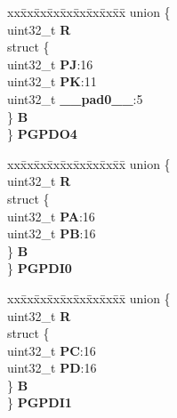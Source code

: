 \begin{DoxyCompactItemize}
\begin{tabbing}
\end{tabbing}\item 
\mbox{\label{structSIU__tag_acfe4dfd750203f12bea97e39471a4794}} 
\begin{tabbing}
xx\=xx\=xx\=xx\=xx\=xx\=xx\=xx\=xx\=\kill
union \{\\
\>uint32\_t {\bfseries R}\\
\>struct \{\\
\>\>uint32\_t {\bfseries PJ}:16\\
\>\>uint32\_t {\bfseries PK}:11\\
\>\>uint32\_t {\bfseries \_\_pad0\_\_}:5\\
\>\} {\bfseries B}\\
\} {\bfseries PGPDO4}\\

\end{tabbing}\item 
\mbox{\label{structSIU__tag_a53e07ba2a2b91a11b14461af9705e61d}} 
\begin{tabbing}
xx\=xx\=xx\=xx\=xx\=xx\=xx\=xx\=xx\=\kill
union \{\\
\>uint32\_t {\bfseries R}\\
\>struct \{\\
\>\>uint32\_t {\bfseries PA}:16\\
\>\>uint32\_t {\bfseries PB}:16\\
\>\} {\bfseries B}\\
\} {\bfseries PGPDI0}\\

\end{tabbing}\item 
\mbox{\label{structSIU__tag_aecb5345b463c7bf04ed2ba6797b3c575}} 
\begin{tabbing}
xx\=xx\=xx\=xx\=xx\=xx\=xx\=xx\=xx\=\kill
union \{\\
\>uint32\_t {\bfseries R}\\
\>struct \{\\
\>\>uint32\_t {\bfseries PC}:16\\
\>\>uint32\_t {\bfseries PD}:16\\
\>\} {\bfseries B}\\
\} {\bfseries PGPDI1}\\


\end{tabbing}
\end{DoxyCompactItemize}
